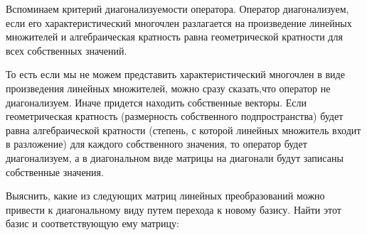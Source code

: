 \documentclass[a4paper]{article}
\begin{document}
    Вспоминаем критерий диагонализуемости оператора. Оператор диагонализуем, если его характеристический многочлен разлагается на произведение линейных множителей и алгебраическая кратность равна геометрической кратности для всех собственных значений.

    То есть если мы не можем представить характеристический многочлен в виде произведения линейных множителей, можно сразу сказать,что оператор не диагонализуем. Иначе придется находить собственные векторы. Если геометрическая кратность (размерность собственного подпространства) будет равна алгебраической кратности (степень, с которой линейных множитель входит в разложение) для каждого собственного значения, то оператор будет диагонализуем, а в диагональном виде матрицы на диагонали будут записаны собственные значения.

    Выяснить, какие из следующих матриц линейных преобразований можно привести к диагональному виду путем перехода к новому базису. Найти этот базис и соответствующую ему матрицу:
\end{document}
